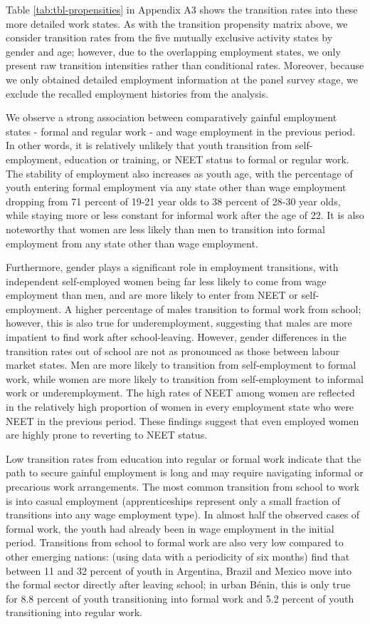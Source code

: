 \documentclass[
  a4paper, twoside, 12pt]{book}
\begin{document}
Table \ref{tab:tbl-propensities} in Appendix A3 shows the transition rates into these more detailed work states. As with the transition propensity matrix above, we consider transition rates from the five mutually exclusive activity states by gender and age; however, due to the overlapping employment states, we only present raw transition intensities rather than conditional rates. Moreover, because we only obtained detailed employment information at the panel survey stage, we exclude the recalled employment histories from the analysis.

We observe a strong association between comparatively gainful employment states - formal and regular work - and wage employment in the previous period. In other words, it is relatively unlikely that youth transition from self-employment, education or training, or NEET status to formal or regular work. The stability of employment also increases as youth age, with the percentage of youth entering formal employment via any state other than wage employment dropping from 71 percent of 19-21 year olds to 38 percent of 28-30 year olds, while staying more or less constant for informal work after the age of 22. It is also noteworthy that women are less likely than men to transition into formal employment from any state other than wage employment.

Furthermore, gender plays a significant role in employment transitions, with independent self-employed women being far less likely to come from wage employment than men, and are more likely to enter from NEET or self-employment. A higher percentage of males transition to formal work from school; however, this is also true for underemployment, suggesting that males are more impatient to find work after school-leaving. However, gender differences in the transition rates out of school are not as pronounced as those between labour market states. Men are more likely to transition from self-employment to formal work, while women are more likely to transition from self-employment to informal work or underemployment. The high rates of NEET among women are reflected in the relatively high proportion of women in every employment state who were NEET in the previous period. These findings suggest that even employed women are highly prone to reverting to NEET status.

Low transition rates from education into regular or formal work indicate that the path to secure gainful employment is long and may require navigating informal or precarious work arrangements. The most common transition from school to work is into casual employment (apprenticeships represent only a small fraction of transitions into any wage employment type). In almost half the observed cases of formal work, the youth had already been in wage employment in the initial period. Transitions from school to formal work are also very low compared to other emerging nations: \textcite{cunningham2011} (using data with a periodicity of six months) find that between 11 and 32 percent of youth in Argentina, Brazil and Mexico move into the formal sector directly after leaving school; in urban Bénin, this is only true for 8.8 percent of youth transitioning into formal work and 5.2 percent of youth transitioning into regular work.
\end{document}
